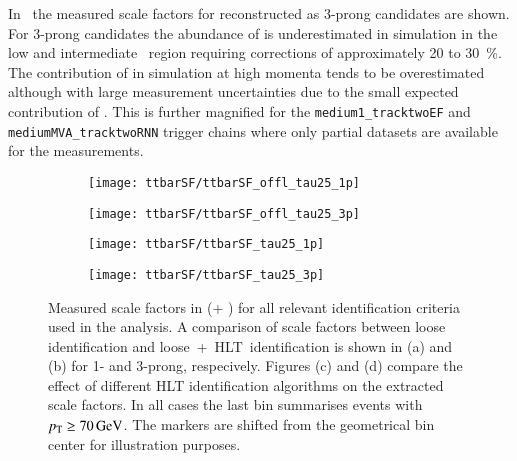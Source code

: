 In~ the
measured scale factors for \faketauhadvis reconstructed as 3-prong
candidates are shown. For 3-prong candidates the abundance of
\faketauhadvis is underestimated in simulation in the low and
intermediate \tauhadvis~\pT region requiring corrections of
approximately \num{20} to \SI{30}{\percent}. The contribution of
\faketauhadvis in simulation at high momenta tends to be overestimated
although with large measurement uncertainties due to the small
expected contribution of \faketauhadvis. This is further magnified for
the \texttt{medium1\_tracktwoEF} and \texttt{mediumMVA\_tracktwoRNN}
trigger chains where only partial datasets are available for the
measurements.


\begin{figure}[htbp]
  \centering

  \begin{subfigure}[t]{.495\textwidth}
    \texttt{[image: ttbarSF/ttbarSF\_offl\_tau25\_1p]}
    \caption{}
    \label{fig:ttbarSF_postfit_SF_a}
  \end{subfigure}\hfill%
  \begin{subfigure}[t]{.495\textwidth}
    \texttt{[image: ttbarSF/ttbarSF\_offl\_tau25\_3p]}
    \caption{}
    \label{fig:ttbarSF_postfit_SF_b}
  \end{subfigure}

  \begin{subfigure}[t]{.495\textwidth}
    \texttt{[image: ttbarSF/ttbarSF\_tau25\_1p]}
    \caption{}
    \label{fig:ttbarSF_postfit_SF_c}
  \end{subfigure}\hfill%
  \begin{subfigure}[t]{.495\textwidth}
    \texttt{[image: ttbarSF/ttbarSF\_tau25\_3p]}
    \caption{}
    \label{fig:ttbarSF_postfit_SF_d}
  \end{subfigure}

  \caption{Measured \faketauhadvis scale factors in \ttbar
    (\POWHEGBOX[v2] + \PYTHIA[8]) for all relevant \tauhadvis
    identification criteria used in the analysis. A comparison of
    \faketauhadvis scale factors between loose identification and
    loose~+~HLT~identification is shown in (a) and (b) for 1- and
    3-prong, respecively. Figures (c) and (d) compare the effect of
    different HLT identification algorithms on the extracted scale
    factors. In all cases the last bin summarises events with
    \tauhadvis~$\pT \geq \SI{70}{\GeV}$.  The markers are shifted from
    the geometrical bin center for illustration purposes.}
  \label{fig:ttbarSF_postfit_SF}
\end{figure}

